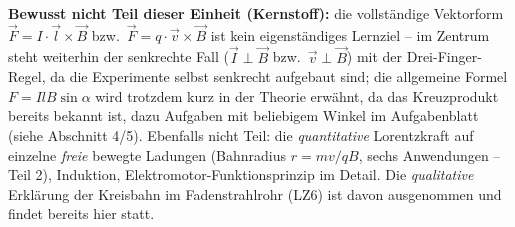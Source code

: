 \documentclass[11pt,a4paper]{article}
\begin{document}
\textbf{Bewusst nicht Teil dieser Einheit (Kernstoff):} die vollständige
Vektorform $\vec F=I\cdot\vec l\times\vec B$ bzw.\ $\vec F=q\cdot\vec
v\times\vec B$ ist kein eigenständiges Lernziel -- im Zentrum steht
weiterhin der senkrechte Fall ($\vec I\perp\vec B$ bzw.\ $\vec v\perp\vec
B$) mit der Drei-Finger-Regel, da die Experimente selbst senkrecht aufgebaut
sind; die allgemeine Formel $F=IlB\sin\alpha$ wird trotzdem kurz in der
Theorie erwähnt, da das Kreuzprodukt bereits bekannt ist, dazu Aufgaben
mit beliebigem Winkel im Aufgabenblatt (siehe Abschnitt 4/5). Ebenfalls
nicht Teil: die \emph{quantitative} Lorentzkraft auf einzelne \emph{freie}
bewegte Ladungen (Bahnradius $r=mv/qB$, sechs Anwendungen -- Teil 2),
Induktion, Elektromotor-Funktionsprinzip im Detail. Die \emph{qualitative}
Erklärung der Kreisbahn im Fadenstrahlrohr (LZ6) ist davon ausgenommen und
findet bereits hier statt.
\end{document}
